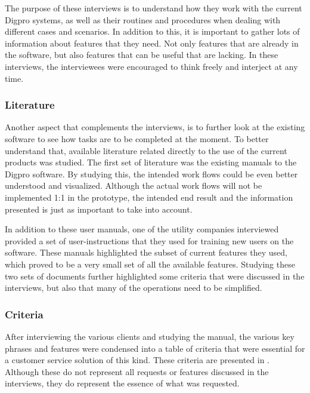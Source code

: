 \documentclass[a4paper,12pt,titlepage]{article}
\begin{document}
The purpose of these interviews is to understand how they work with the current Digpro systems, as well as their routines and procedures when dealing with different cases and scenarios. In addition to this, it is important to gather lots of information about features that they need. Not only features that are already in the software, but also features that can be useful that are lacking. In these interviews, the interviewees were encouraged to think freely and interject at any time. 

\subsubsection{Literature}

Another aspect that complements the interviews, is to further look at the existing software to see how tasks are to be completed at the moment. To better understand that, available literature related directly to the use of the current products was studied. The first set of literature was the existing manuals to the Digpro software. By studying this, the intended work flows could be even better understood and visualized. Although the actual work flows will not be implemented 1:1 in the prototype, the intended end result and the information presented is just as important to take into account.

In addition to these user manuals, one of the utility companies interviewed provided a set of user-instructions that they used for training new users on the software. These manuals highlighted the subset of current features they used, which proved to be a very small set of all the available features. Studying these two sets of documents further highlighted some criteria that were discussed in the interviews, but also that many of the operations need to be simplified.

\subsubsection{Criteria}

After interviewing the various clients and studying the manual, the various key phrases and features were condensed into a table of criteria that were essential for a customer service solution of this kind. These criteria are presented in . Although these do not represent all requests or features discussed in the interviews, they do represent the essence of what was requested.
\end{document}
